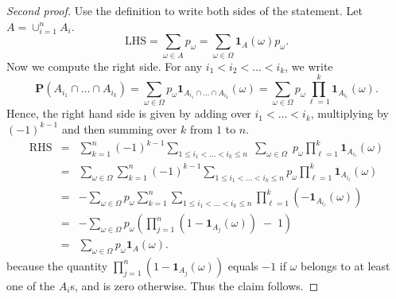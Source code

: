 \documentclass[preprint,  11pt]{amsart}
\newcommand\bes{\begin{eqnarray*}}
\newcommand\ees{\end{eqnarray*}}
\theoremstyle{plain} %
\newtheorem{proposition}[theorem]{Proposition}
\theoremstyle{definition} %
\begin{document}
\begin{proof}[Second proof] Use the definition to write both sides of the statement. Let $A=\cup_{i=1}^{n}A_{i}$.
$$
\mbox{LHS}= \sum\limits_{\omega\in A}p_{\omega} = \sum\limits_{\omega\in \Omega}{\mathbf 1}_{A}(\omega)p_{\omega}.
$$
Now we compute the right side. For any $i_{1}<i_{2}<\ldots <i_{k}$, we write
$$
\mathbf{P}\left(A_{i_{1}}\cap \ldots \cap A_{i_{k}}\right) =\sum\limits_{\omega\in \Omega}p_{\omega}{\mathbf 1}_{A_{i_{1}}\cap \ldots \cap A_{i_{k}}}(\omega)= \sum\limits_{\omega\in \Omega}p_{\omega}\prod\limits_{\ell=1}^{k}{\mathbf 1}_{A_{i_{\ell}}}(\omega).
$$
Hence, the right hand side is given by adding over $i_{1}<\ldots <i_{k}$, multiplying by $(-1)^{k-1}$ and then summing over $k$ from $1$ to $n$.
\bes
\mbox{RHS} &=& \sum\limits_{k=1}^{n}(-1)^{k-1}\sum\limits_{1\le i_{1}<\ldots <i_{k}\le n} \; \sum\limits_{\omega\in \Omega} \;p_{\omega}\prod\limits_{\ell=1}^{k}{\mathbf 1}_{A_{i_{\ell}}}(\omega) \\
&=& \sum\limits_{\omega \in \Omega}\sum\limits_{k=1}^{n}(-1)^{k-1}\sum\limits_{1\le i_{1}<\ldots <i_{k}\le n} p_{\omega}\prod\limits_{\ell=1}^{k}{\mathbf 1}_{A_{i_{\ell}}}(\omega) \\
&=& -\sum\limits_{\omega \in \Omega}p_{\omega}\sum\limits_{k=1}^{n}\sum\limits_{1\le i_{1}<\ldots <i_{k}\le n}\prod\limits_{\ell=1}^{k}(-{\mathbf 1}_{A_{i_{\ell}}}(\omega)) \\
&=& -\sum\limits_{\omega \in \Omega}p_{\omega} \left(\prod\limits_{j=1}^{n}(1-{\mathbf 1}_{A_{j}}(\omega)) \; - \; 1\right) \\
&=& \sum\limits_{\omega \in \Omega}p_{\omega}{\mathbf 1}_{A}(\omega).
\ees
because the quantity $\prod\limits_{j=1}^{n}(1-{\mathbf 1}_{A_{j}}(\omega))$ equals $-1$ if $\omega$ belongs to at least one of the $A_{i}$s, and is zero otherwise. Thus the claim follows.
\end{proof}
\end{document}
